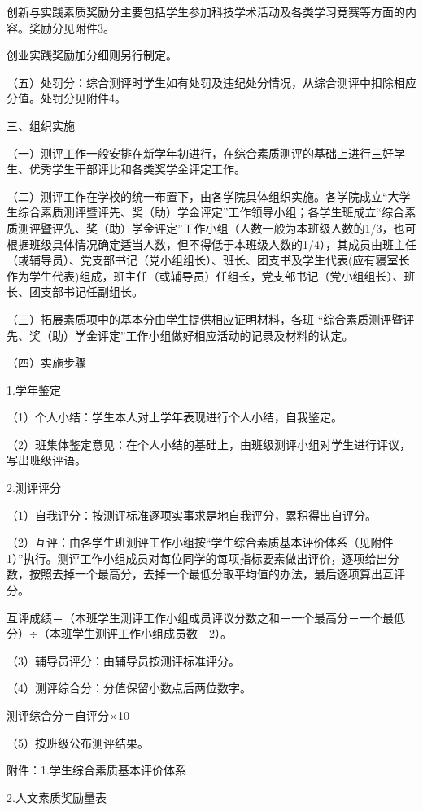 \documentclass[UTF8,12pt,a4paper]{report}
\begin{document}
创新与实践素质奖励分主要包括学生参加科技学术活动及各类学习竞赛等方面的内容。奖励分见附件3。

创业实践奖励加分细则另行制定。

（五）处罚分：综合测评时学生如有处罚及违纪处分情况，从综合测评中扣除相应分值。处罚分见附件4。

三、组织实施

（一）测评工作一般安排在新学年初进行，在综合素质测评的基础上进行三好学生、优秀学生干部评比和各类奖学金评定工作。

（二）测评工作在学校的统一布置下，由各学院具体组织实施。各学院成立“大学生综合素质测评暨评先、奖（助）学金评定”工作领导小组；各学生班成立“综合素质测评暨评先、奖（助）学金评定”工作小组（人数一般为本班级人数的1/3，也可根据班级具体情况确定适当人数，但不得低于本班级人数的1/4），其成员由班主任（或辅导员）、党支部书记（党小组组长）、班长、团支书及学生代表(应有寝室长作为学生代表)组成，班主任（或辅导员）任组长，党支部书记（党小组组长）、班长、团支部书记任副组长。

（三）拓展素质项中的基本分由学生提供相应证明材料，各班 “综合素质测评暨评先、奖（助）学金评定”工作小组做好相应活动的记录及材料的认定。

（四）实施步骤

1.学年鉴定

（1）个人小结：学生本人对上学年表现进行个人小结，自我鉴定。

（2）班集体鉴定意见：在个人小结的基础上，由班级测评小组对学生进行评议，写出班级评语。

2.测评评分

（1）自我评分：按测评标准逐项实事求是地自我评分，累积得出自评分。

（2）互评：由各学生班测评工作小组按“学生综合素质基本评价体系（见附件1）”执行。测评工作小组成员对每位同学的每项指标要素做出评价，逐项给出分数，按照去掉一个最高分，去掉一个最低分取平均值的办法，最后逐项算出互评分。

互评成绩＝（本班学生测评工作小组成员评议分数之和－一个最高分－一个最低分）$\div$（本班学生测评工作小组成员数－2）。

（3）辅导员评分：由辅导员按测评标准评分。

（4）测评综合分：分值保留小数点后两位数字。

测评综合分＝自评分$\times$10%

（5）按班级公布测评结果。

附件：1.学生综合素质基本评价体系

2.人文素质奖励量表
\end{document}
